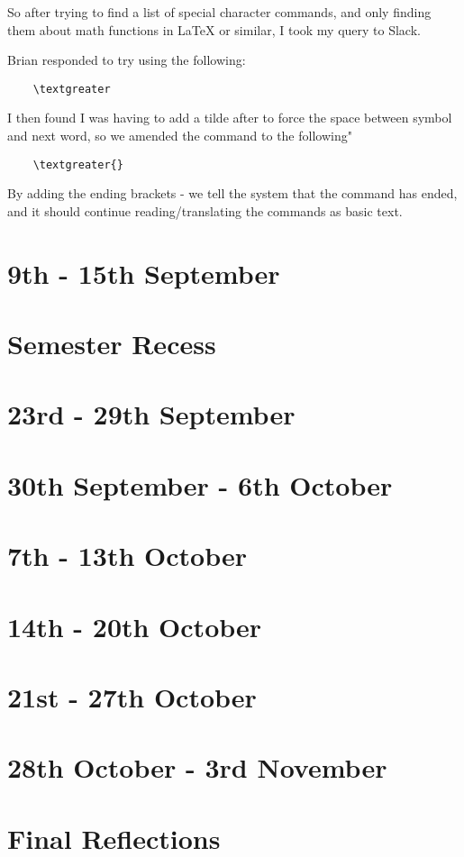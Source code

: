 \documentclass{article}
\begin{document}
So after trying to find a list of special character commands, and only finding them about math functions in LaTeX or similar, I took my query to Slack.

Brian responded to try using the following: 
\begin{verbatim}
    \textgreater
\end{verbatim}

I then found I was having to add a tilde after to force the space between symbol and next word, so we amended the command to the following"
\begin{verbatim}
    \textgreater{}
\end{verbatim}

By adding the ending brackets - we tell the system that the command has ended, and it should continue reading/translating the commands as basic text. 


\section{9th - 15th September}

\section*{Semester Recess}

\section{23rd - 29th September}

\section{30th September - 6th October}

\section{7th - 13th October}

\section{14th - 20th October}

\section{21st - 27th October}

\section{28th October - 3rd November}

\section*{Final Reflections}
\end{document}

